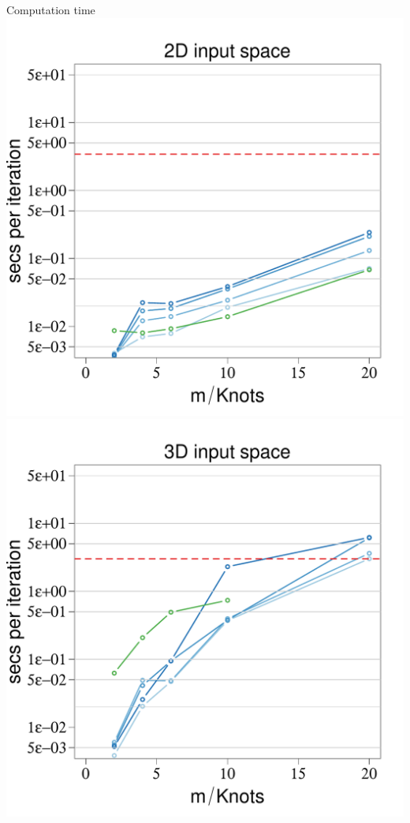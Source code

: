 \documentclass[8pt]{beamer} %
\begin{document}
\begin{frame}[t]

\begin{center}
\centering  \small Computation time \\[-1mm]
%
\includegraphics[scale=0.20, trim = 1mm 0mm 10mm 0mm, clip]{ch5_fig20_time2D_diabetes_2.pdf}
\includegraphics[scale=0.20, trim = 30.2mm 0mm 10mm 0mm, clip]{ch5_fig20_time3D_diabetes_2.pdf}

\end{center}
\end{frame}
\end{document}
